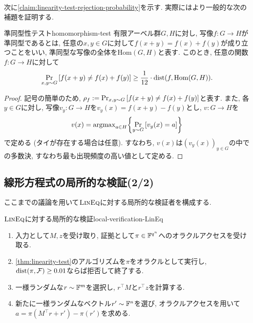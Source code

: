   次に\cref{claim:linearity-test-rejection-probability}を示す.
  実際にはより一般的な次の補題を証明する.
  \begin{lemma}{準同型性テスト}{homomorphism-test}
    有限アーベル群$G,H$に対し, 写像$f\colon G\to H$が準同型であるとは, 任意の$x,y\in G$に対して$f(x+y)=f(x)+f(y)$が成り立つことをいい,
    準同型な写像の全体を$\mathrm{Hom}(G,H)$と表す.
    このとき, 任意の関数$f\colon G\to H$に対して
    \begin{align*}
      \Pr_{x,y\sim G}\qty[ f(x+y)\ne f(x)+f(y) ] \ge \frac{1}{12}\cdot \mathrm{dist}(f,\mathrm{Hom}(G,H)).
    \end{align*}
  \end{lemma}
  \begin{proof}
    記号の簡単のため, $\rho_f:=\Pr_{x,y\sim G}\qty[ f(x+y)\ne f(x)+f(y) ]$と表す.
    また, 各$y\in G$に対し, 写像$v_y\colon G\to H$を$v_y(x)=f(x+y)-f(y)$とし, $v\colon G\to H$を
    \begin{align*}
      v(x) = \mathrm{argmax}_{a \in H} \qty{ \Pr_{y\sim G}\qty[ v_y(x)=a ] }
    \end{align*}
    で定める (タイが存在する場合は任意).
    すなわち, $v(x)$は$(v_y(x))_{y\in G}$の中での多数決, すなわち最も出現頻度の高い値として定める.
    
  \end{proof}

\subsection{線形方程式の局所的な検証(2/2)}
ここまでの議論を用いて$\textsc{LinEq}$に対する局所的な検証者を構成する.
\begin{algorithm}{$\textsc{LinEq}$に対する局所的な検証}{local-verification-LinEq}
  \begin{enumerate}
    \item 入力として$M,z$を受け取り, 証拠として$\pi \in \mathbb{F}^{q^n}$へのオラクルアクセスを受け取る.
    \item \cref{thm:linearity-test}のアルゴリズムを$\pi$をオラクルとして実行し, $\mathrm{dist}(\pi,\mathcal{F})\ge 0.01$ならば拒否して終了する.
    \item 一様ランダムな$r\sim\mathbb{F}^m$を選択し, $r^\top M$と$r^\top z$を計算する.
    \item 新たに一様ランダムなベクトル$r'\sim\mathbb{F}^n$を選び, オラクルアクセスを用いて$a=\pi(M^\top r + r') - \pi(r')$を求める.
  \end{enumerate}
\end{algorithm}





